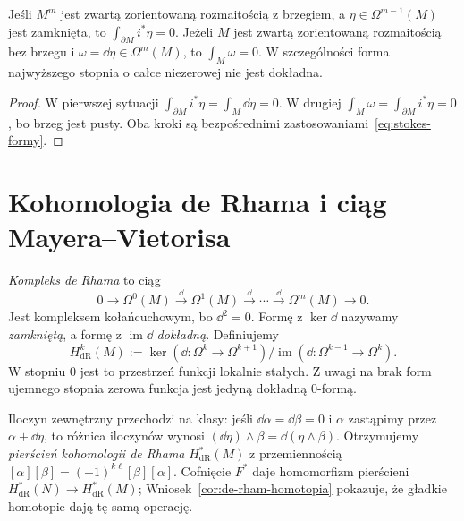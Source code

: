 \begin{wniosek}
\label{cor:stokes-top-form}
Jeśli $M^m$ jest zwartą zorientowaną rozmaitością
z brzegiem, a $\eta\in\Omega^{m-1}(M)$ jest
zamknięta, to $\int_{\partial M}i^*\eta=0$.
Jeżeli $M$ jest zwartą zorientowaną rozmaitością
bez brzegu i $\omega=\dd\eta\in\Omega^m(M)$,
to $\int_M\omega=0$. W szczególności forma
najwyższego stopnia o całce niezerowej nie jest
dokładna.
\end{wniosek}
\begin{proof}
W pierwszej sytuacji
$\int_{\partial M}i^*\eta=\int_M\dd\eta=0$.
W drugiej
$\int_M\omega=\int_{\partial M}i^*\eta=0$,
bo brzeg jest pusty. Oba kroki są
bezpośrednimi zastosowaniami~\eqref{eq:stokes-formy}.
\end{proof}
\section{Kohomologia de Rhama i ciąg Mayera--Vietorisa}
\label{sec:de-rham-mv}

\begin{definicja}
\label{def:de-rham-cohomology}
\emph{Kompleks de Rhama} to ciąg
\[
 0\longrightarrow\Omega^0(M)\xrightarrow{\dd}
 \Omega^1(M)\xrightarrow{\dd}\cdots
 \xrightarrow{\dd}\Omega^m(M)\longrightarrow0.
\]
Jest kompleksem kołańcuchowym, bo $\dd^2=0$.
Formę z $\ker\dd$ nazywamy \emph{zamkniętą},
a formę z $\operatorname{im}\dd$ \emph{dokładną}. Definiujemy
\[
 H^k_{\mathrm{dR}}(M)
 :=\ker(\dd:\Omega^k\to\Omega^{k+1})/
   \operatorname{im}(\dd:\Omega^{k-1}\to\Omega^k).
\]
W stopniu $0$ jest to przestrzeń funkcji lokalnie stałych.
Z uwagi na brak form ujemnego stopnia zerowa funkcja
jest jedyną dokładną $0$-formą.
\end{definicja}

Iloczyn zewnętrzny przechodzi na klasy: jeśli
$\dd\alpha=\dd\beta=0$ i $\alpha$ zastąpimy przez
$\alpha+\dd\eta$, to różnica iloczynów wynosi
$(\dd\eta)\wedge\beta=\dd(\eta\wedge\beta)$.
Otrzymujemy \emph{pierścień kohomologii de Rhama}
$H^*_{\mathrm{dR}}(M)$ z przemiennością
$[\alpha][\beta]=(-1)^{k\ell}[\beta][\alpha]$.
Cofnięcie $F^*$ daje homomorfizm pierścieni
$H^*_{\mathrm{dR}}(N)\to H^*_{\mathrm{dR}}(M)$;
Wniosek~\ref{cor:de-rham-homotopia} pokazuje, że
gładkie homotopie dają tę samą operację.

